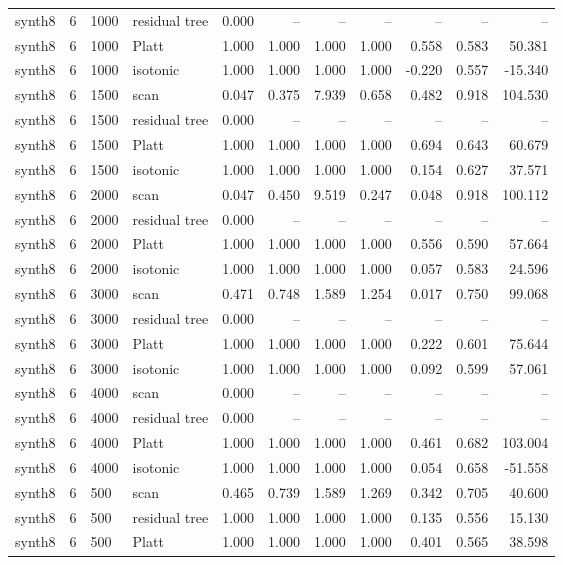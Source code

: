 \begin{tabular}{lrllrrrrrrr}
synth8 & 6 & 1000 & residual tree & 0.000 & -- & -- & -- & -- & -- & -- \\
synth8 & 6 & 1000 & Platt & 1.000 & 1.000 & 1.000 & 1.000 & 0.558 & 0.583 & 50.381 \\
synth8 & 6 & 1000 & isotonic & 1.000 & 1.000 & 1.000 & 1.000 & -0.220 & 0.557 & -15.340 \\
synth8 & 6 & 1500 & scan & 0.047 & 0.375 & 7.939 & 0.658 & 0.482 & 0.918 & 104.530 \\
synth8 & 6 & 1500 & residual tree & 0.000 & -- & -- & -- & -- & -- & -- \\
synth8 & 6 & 1500 & Platt & 1.000 & 1.000 & 1.000 & 1.000 & 0.694 & 0.643 & 60.679 \\
synth8 & 6 & 1500 & isotonic & 1.000 & 1.000 & 1.000 & 1.000 & 0.154 & 0.627 & 37.571 \\
synth8 & 6 & 2000 & scan & 0.047 & 0.450 & 9.519 & 0.247 & 0.048 & 0.918 & 100.112 \\
synth8 & 6 & 2000 & residual tree & 0.000 & -- & -- & -- & -- & -- & -- \\
synth8 & 6 & 2000 & Platt & 1.000 & 1.000 & 1.000 & 1.000 & 0.556 & 0.590 & 57.664 \\
synth8 & 6 & 2000 & isotonic & 1.000 & 1.000 & 1.000 & 1.000 & 0.057 & 0.583 & 24.596 \\
synth8 & 6 & 3000 & scan & 0.471 & 0.748 & 1.589 & 1.254 & 0.017 & 0.750 & 99.068 \\
synth8 & 6 & 3000 & residual tree & 0.000 & -- & -- & -- & -- & -- & -- \\
synth8 & 6 & 3000 & Platt & 1.000 & 1.000 & 1.000 & 1.000 & 0.222 & 0.601 & 75.644 \\
synth8 & 6 & 3000 & isotonic & 1.000 & 1.000 & 1.000 & 1.000 & 0.092 & 0.599 & 57.061 \\
synth8 & 6 & 4000 & scan & 0.000 & -- & -- & -- & -- & -- & -- \\
synth8 & 6 & 4000 & residual tree & 0.000 & -- & -- & -- & -- & -- & -- \\
synth8 & 6 & 4000 & Platt & 1.000 & 1.000 & 1.000 & 1.000 & 0.461 & 0.682 & 103.004 \\
synth8 & 6 & 4000 & isotonic & 1.000 & 1.000 & 1.000 & 1.000 & 0.054 & 0.658 & -51.558 \\
synth8 & 6 & 500 & scan & 0.465 & 0.739 & 1.589 & 1.269 & 0.342 & 0.705 & 40.600 \\
synth8 & 6 & 500 & residual tree & 1.000 & 1.000 & 1.000 & 1.000 & 0.135 & 0.556 & 15.130 \\
synth8 & 6 & 500 & Platt & 1.000 & 1.000 & 1.000 & 1.000 & 0.401 & 0.565 & 38.598 \\

\end{tabular}
